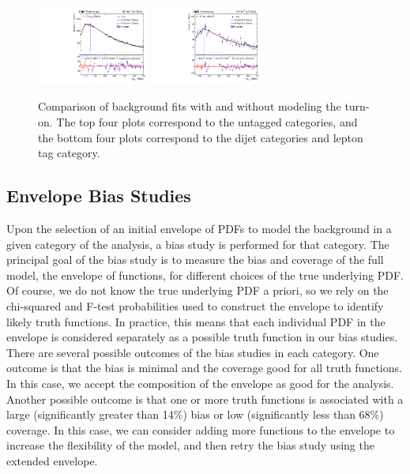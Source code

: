 \begin{figure}
\begin{center}
        \includegraphics[width=0.33\textwidth]{fig/turnon_comparison/plot_cat503_prefit_new.pdf}
        \includegraphics[width=0.33\textwidth]{fig/turnon_comparison/over_plot6789_prefit_new.pdf}
        \caption{Comparison of background fits with and without modeling the turn-on. 
        The top four plots correspond to the untagged categories, and the bottom four plots correspond to the dijet categories and lepton tag category.}
		\label{fig:compare_turnon_fits}
	\end{center}
\end{figure}

\subsection{Envelope Bias Studies}\label{sec:envelope_bias_studies}
Upon the selection of an initial envelope of PDFs to model the background in a 
given category of the analysis, a bias study is performed for that category. 
The principal goal of the bias study is to measure the bias and coverage of the 
full model, the envelope of functions, for different choices of the true 
underlying PDF. Of course, we do not know the true underlying PDF a priori, so 
we rely on the chi-squared and F-test probabilities used to construct the 
envelope to identify likely truth functions. In practice, this means that each 
individual PDF in the envelope is considered separately as a possible truth function
in our bias studies. There are several possible outcomes of the bias studies in each 
category. One outcome is that the bias is minimal and the coverage good for all 
truth functions. In this case, we accept the composition of the envelope as good 
for the analysis. Another possible outcome is that one or more truth functions is 
associated with a large (significantly greater than 14\%) bias or low 
(significantly less than 68\%) coverage. In this case, we can consider adding 
more functions to the envelope to increase the flexibility of the model, and then 
retry the bias study using the extended envelope. 

